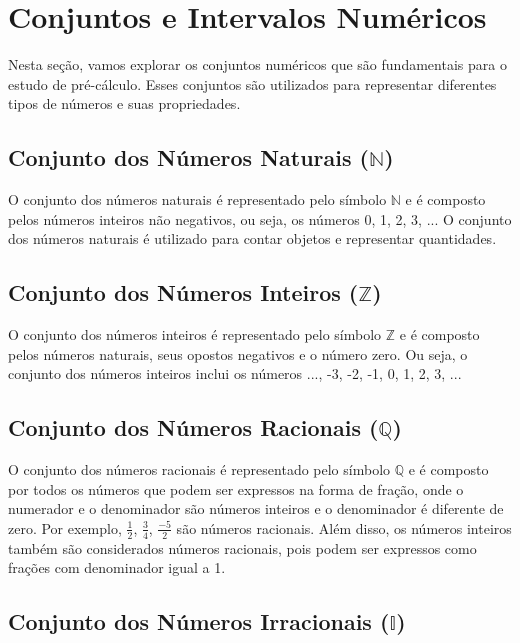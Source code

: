 \documentclass[12pt]{article}
\begin{document}
\pagebreak
\section{Conjuntos e Intervalos Numéricos}

Nesta seção, vamos explorar os conjuntos numéricos que são fundamentais para o estudo de pré-cálculo. Esses conjuntos são utilizados para representar diferentes tipos de números e suas propriedades.

\subsection{Conjunto dos Números Naturais ($\mathbb{N}$)}

O conjunto dos números naturais é representado pelo símbolo $\mathbb{N}$ e é composto pelos números inteiros não negativos, ou seja, os números 0, 1, 2, 3, ... O conjunto dos números naturais é utilizado para contar objetos e representar quantidades.

\subsection{Conjunto dos Números Inteiros ($\mathbb{Z}$)}

O conjunto dos números inteiros é representado pelo símbolo $\mathbb{Z}$ e é composto pelos números naturais, seus opostos negativos e o número zero. Ou seja, o conjunto dos números inteiros inclui os números ..., -3, -2, -1, 0, 1, 2, 3, ...

\subsection{Conjunto dos Números Racionais ($\mathbb{Q}$)}

O conjunto dos números racionais é representado pelo símbolo $\mathbb{Q}$ e é composto por todos os números que podem ser expressos na forma de fração, onde o numerador e o denominador são números inteiros e o denominador é diferente de zero. Por exemplo, $\frac{1}{2}$, $\frac{3}{4}$, $\frac{-5}{2}$ são números racionais. Além disso, os números inteiros também são considerados números racionais, pois podem ser expressos como frações com denominador igual a 1.

\subsection{Conjunto dos Números Irracionais ($\mathbb{I}$)}
\end{document}
